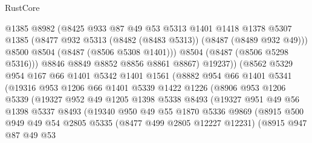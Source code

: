 \begin{lexlean}{RustCore}
\begin{coremodule}
                      @1385
                      @8982
                      (@8425
                        @933
                        @87
                        @49
                        @53
                        @5313
                        @1401
                        @1418
                        @1378
                        @5307
                        @1385
                        (@8477 @932 @5313 (@8482 (@8483 @5313)) (@8487 (@8489 @932 @49)))
                        @8500
                        @8504
                        (@8487 (@8506 @5308 @1401)))
                      @8504
                      (@8487 (@8506 @5298 @5316)))
                    @8846
                    @8849
                    @8852
                    @8856
                    @8861
                    @8867)
                  @19237))
              (@8562
                @5329
                @954
                @167
                @66
                @1401
                @5342
                @1401
                @1561
                (@8882
                  @954
                  @66
                  @1401
                  @5341
                  (@19316
                    @953
                    @1206
                    @66
                    @1401
                    @5339
                    @1422
                    @1226
                    (@8906
                      @953
                      @1206
                      @5339
                      (@19327
                        @952
                        @49
                        @1205
                        @1398
                        @5338
                        @8493
                        (@19327
                          @951
                          @49
                          @56
                          @1398
                          @5337
                          @8493
                          (@19340
                            @950
                            @49
                            @55
                            @1870
                            @5336
                            @9869
                            (@8915
                              @500
                              @949
                              @49
                              @54
                              @2805
                              @5335
                              (@8477 @499 @2805 @12227 @12231)
                              (@8915
                                @947
                                @87
                                @49
                                @53

\end{coremodule}
\end{lexlean}
